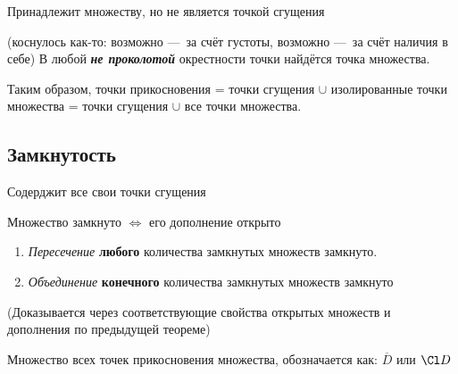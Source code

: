 \documentclass[12pt, a4paper]{article}
\begin{document}
  \begin{definition}
    Принадлежит множеству, но не является точкой сгущения
  \end{definition}

  \begin{definition}
     (коснулось как-то: возможно — за счёт густоты, возможно — за счёт наличия в себе)
    В любой \textit{\textbf{не проколотой}} окрестности точки найдётся точка множества.
  \end{definition}

  \begin{note}
    Таким образом, 
    точки прикосновения = 
    точки сгущения $\cup$ изолированные точки множества = 
    точки сгущения $\cup$ все точки множества.     
  \end{note}
  
  \ornamentbreak %
  \subsection{Замкнутость}

  \begin{definition}
    Содерджит все свои точки сгущения
  \end{definition}

  \begin{theorem}
    Множество замкнуто $\Longleftrightarrow$ его дополнение открыто
  \end{theorem}

  \begin{property}

    \begin{enumerate}
      \item \textit{Пересечение} \textbf{любого} количества замкнутых множеств замкнуто.
      \item \textit{Объединение} \textbf{конечного} количества замкнутых множеств замкнуто
    \end{enumerate}

    (Доказывается через соответствующие свойства открытых множеств и дополнения по предыдущей теореме)
  \end{property}

  \begin{definition}
    [Замыкание]
    Множество всех точек прикосновения множества, обозначается как: $\overline{D}$ или $\Cl D$
  \end{definition}
\end{document}
